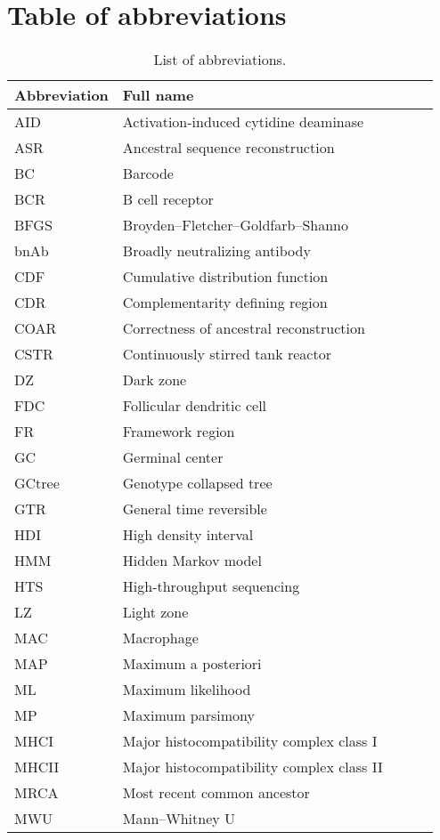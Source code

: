 \chapter{Table of abbreviations}

\begin{table}[!ht]
\begin{tabular}{l*{3}{l}r}
	 \textbf{Abbreviation} & \textbf{Full name} \\
	\hline
	AID & Activation-induced cytidine deaminase \\
	ASR & Ancestral sequence reconstruction \\
	BC & Barcode \\
	BCR & B cell receptor \\
	BFGS & Broyden–Fletcher–Goldfarb–Shanno \\
	bnAb & Broadly neutralizing antibody \\
	CDF & Cumulative distribution function \\
	CDR & Complementarity defining region \\
	COAR & Correctness of ancestral reconstruction \\
	CSTR & Continuously stirred tank reactor \\
	DZ & Dark zone \\
	FDC & Follicular dendritic cell \\
	FR & Framework region \\
	GC & Germinal center \\
	GCtree & Genotype collapsed tree \\
	GTR & General time reversible \\
	HDI & High density interval \\
	HMM & Hidden Markov model \\
	HTS & High-throughput sequencing \\
    LZ & Light zone \\
	MAC & Macrophage \\
	MAP & Maximum a posteriori \\
	ML & Maximum likelihood \\
	MP & Maximum parsimony \\
	MHCI & Major histocompatibility complex class I \\
	MHCII & Major histocompatibility complex class II \\
	MRCA & Most recent common ancestor \\
	MWU & Mann–Whitney U \\
	\hline
\end{tabular}
\caption{List of abbreviations.}
\end{table}

